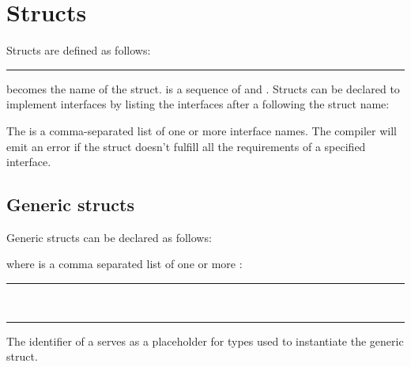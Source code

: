 \section{Structs}

Structs are defined as follows:

\begin{grammar}
\rule{struct-definition}   \code{\{}  \code{\}}
\end{grammar}

 becomes the name of the struct.
 is a sequence of
 and
. Structs can be declared to implement
interfaces by listing the interfaces after a \code{:} following the struct name:

\begin{grammar}
  \code{:}  \code{\{}  \code{\}}
\end{grammar}

The  is a comma-separated list of one or more
interface names. The compiler will emit an error if the struct doesn't fulfill
all the requirements of a specified interface.

\subsection{Generic structs}

Generic structs can be declared as follows:

\begin{grammar}
  \code{<}  \code{>} \code{\{}  \code{\}}
\end{grammar}

where  is a comma separated list of one or
more :

\begin{grammar}
\rule{generic-parameter} \\
\rule{generic-type-parameter} 
\end{grammar}

The identifier of a  serves as a placeholder
for types used to instantiate the generic struct.
